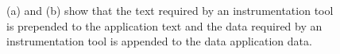 \begin{figure}[ht]
\centering
\caption{(a) and (b) show that the
text required by an instrumentation tool is prepended to the application text and the data required by an instrumentation
tool is appended to the data application data.}
\label{fig:Executable}
\end{figure}


